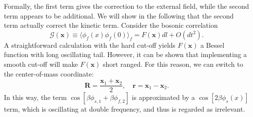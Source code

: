 \documentclass[aps,prb,superscriptaddress,nofootinbib]{revtex4}
\begin{document}
Formally, the first term gives the correction to the external field, while the second term appears to be additional.
We will show in the following that the second term actually correct the kinetic term.
Consider the bosonic correlation
\begin{equation}
	\mathcal G(\bm x) \equiv \langle \phi_f(x) \phi_f(0)\rangle_f = F(\bm x) dl + O(dt^2).
\end{equation}
A straightforward calculation with the hard cut-off yields $F(\bm x)$ a Bessel function with long oscillating tail.
However, it can be shown that implementing a smooth cut-off will make $F(\bm x)$ short ranged.
For this reason, we can switch to the center-of-mass coordinate:
\begin{equation}
	\bm R = \frac{\bm x_1 + \bm x_2}{2}, \quad \bm r = \bm x_1 - \bm x_2.
\end{equation}
In this way, the term $\cos\left[\beta\phi_{s,1} +\beta\phi_{f,2}\right]$ is approximated by a $\cos\left[2\beta\phi_s(x)\right]$ term, which is oscillating at double frequency, and thus is regarded as irrelevant.
\end{document}
